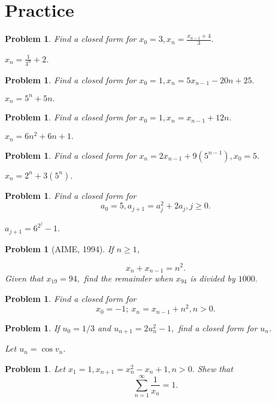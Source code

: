 \documentclass[11pt, openany]{book}
\theoremstyle{change} \theoremheaderfont{\blue\sffamily\bfseries}
\newtheorem{pro}[thm]{Problem}
\theoremstyle{nonumberplain} \theoremheaderfont{\sffamily\bfseries}
\newcommand{\dis}{\displaystyle}
\newcommand{\í}{\'{\i}}
\begin{document}
\section*{Practice}\begin{multicols}{2}\columnseprule 1pt \columnsep 25pt

\begin{pro}
Find a closed form for $\dis{x_0 = 3, x_n = \frac{x_{n - 1} +
4}{3}.}$
\begin{answer}
 $x_n = \dis{\frac{1}{3^n} + 2}$.
\end{answer}
\end{pro}
\begin{pro}
Find a closed form for $\dis{x_0 = 1, x_n = 5x_{n - 1} - 20n +
25.}$
\begin{answer}
$x_n = 5^n + 5n.$
\end{answer}
\end{pro}
\begin{pro}
Find a closed form for $\dis{x_0 = 1, x_n = x_{n - 1} + 12n.}$
\begin{answer}
$x_n = 6n^2 + 6n + 1.$
\end{answer}
\end{pro}
\begin{pro}
Find a closed form for $x_n = 2x_{n - 1} + 9(5^{n - 1}), x_0 = 5.$
\begin{answer}
$x_n = 2^n + 3(5^n).$
\end{answer}
\end{pro}
\begin{pro}
Find a closed form for
$$a_0 = 5, a_{j + 1} = a_j ^2 + 2a_j, j \geq 0.$$
\begin{answer}
$a_{j + 1} = 6^{2^j} - 1.$
\end{answer}
\end{pro}


\begin{pro}[AIME, 1994] If $n \geq 1$,

$$x_n + x_{n - 1} = n^2.$$Given that $x_{19} = 94,$ find the remainder when $x_{94}$ is divided by
$1000.$
\end{pro}

\begin{pro} Find a closed form for
$$x_0 = -1; \ x_n = x_{n - 1} + n^2, n > 0.$$
\end{pro}

\begin{pro}
If $u_0 = 1/3$ and $u_{n + 1} = 2u_n ^2 - 1,$ find a closed form
for $u_n$.
\begin{answer}
Let $u_n = \cos v_n.$
\end{answer}
\end{pro}
\begin{pro}
Let $x_1 = 1, x_{n + 1} = x_n ^2 - x_n + 1, n > 0.$ Shew that
$$\sum _{n = 1} ^\infty \frac{1}{x_n} = 1.$$
\end{pro}

\end{multicols}
\end{document}
